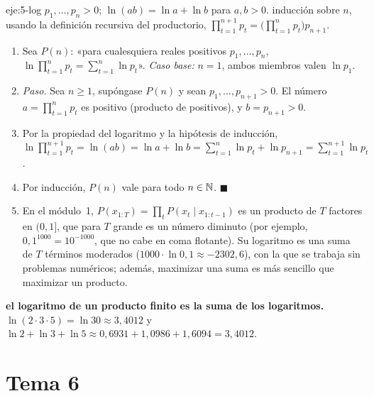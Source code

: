 \begin{solucion}{eje:5-log}
\datos $p_1,\dots,p_n>0$; $\ln(ab)=\ln a+\ln b$ para $a,b>0$.
\planteamiento inducción sobre $n$, usando la definición recursiva del productorio, $\prod_{t=1}^{n+1}p_t=\bigl(\prod_{t=1}^{n}p_t\bigr)p_{n+1}$.
\pasos
\begin{enumerate}[label=\arabic*.]
  \item Sea $P(n)$: «para cualesquiera reales positivos $p_1,\dots,p_n$, $\ln\prod_{t=1}^{n}p_t=\sum_{t=1}^{n}\ln p_t$». \emph{Caso base:} $n=1$, ambos miembros valen $\ln p_1$.
  \item \emph{Paso.} Sea $n\ge 1$, supóngase $P(n)$ y sean $p_1,\dots,p_{n+1}>0$. El número $a=\prod_{t=1}^{n}p_t$ es positivo (producto de positivos), y $b=p_{n+1}>0$.
  \item Por la propiedad del logaritmo y la hipótesis de inducción, $\ln\prod_{t=1}^{n+1}p_t=\ln(ab)=\ln a+\ln b=\sum_{t=1}^{n}\ln p_t+\ln p_{n+1}=\sum_{t=1}^{n+1}\ln p_t$.
  \item Por inducción, $P(n)$ vale para todo $n\in\mathbb{N}$. $\blacksquare$
  \item En el módulo~1, $P(x_{1:T})=\prod_{t}P(x_t\mid x_{1:t-1})$ es un producto de $T$ factores en $(0,1]$, que para $T$ grande es un número diminuto (por ejemplo, $0{,}1^{1000}=10^{-1000}$, que no cabe en coma flotante). Su logaritmo es una suma de $T$ términos moderados ($1000\cdot\ln 0{,}1\approx -2302{,}6$), con la que se trabaja sin problemas numéricos; además, maximizar una suma es más sencillo que maximizar un producto.
\end{enumerate}
\resultado \textbf{el logaritmo de un producto finito es la suma de los logaritmos.}
\comprobacion $\ln(2\cdot 3\cdot 5)=\ln 30\approx 3{,}4012$ y $\ln 2+\ln 3+\ln 5\approx 0{,}6931+1{,}0986+1{,}6094=3{,}4012$.
\end{solucion}

\section{Tema 6}

